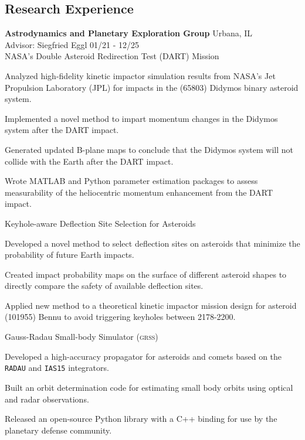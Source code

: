 \documentclass[margin,line]{res}
\newlength{\myitemspacing}
\newenvironment{list_new}{
    \begin{list}{\scriptsize{$\bullet$}}{%
        \setlength{\itemsep}{0in}
        \setlength{\parsep}{\myitemspacing} \setlength{\parskip}{0in}
        \setlength{\topsep}{0in} \setlength{\partopsep}{0in} 
        \setlength{\leftmargin}{0.2in}
        }}
    {\end{list}
}
\begin{document}
\begin{resume}
\section{\sc Research Experience}
{\bf Astrodynamics and Planetary Exploration Group} \hfill Urbana, IL\\
Advisor: Siegfried Eggl \hfill 01/21 - 12/25\\
NASA's Double Asteroid Redirection Test (DART) Mission
\begin{list_new}
    \item Analyzed high-fidelity kinetic impactor simulation results from NASA's Jet Propulsion Laboratory (JPL) for impacts in the (65803) Didymos binary asteroid system.
    \item Implemented a novel method to impart momentum changes in the Didymos system after the DART impact.
    \item Generated updated B-plane maps to conclude that the Didymos system will not collide with the Earth after the DART impact.
    \item Wrote MATLAB and Python parameter estimation packages to assess measurability of the heliocentric momentum enhancement from the DART impact.
\end{list_new}
Keyhole-aware Deflection Site Selection for Asteroids
\begin{list_new}
    \item Developed a novel method to select deflection sites on asteroids that minimize the probability of future Earth impacts.
    \item Created impact probability maps on the surface of different asteroid shapes to directly compare the safety of available deflection sites.
    \item Applied new method to a theoretical kinetic impactor mission design for asteroid (101955) Bennu to avoid triggering keyholes between 2178-2200.
\end{list_new}
Gauss-Radau Small-body Simulator (\textsc{grss})
\begin{list_new}
    \item Developed a high-accuracy propagator for asteroids and comets based on the \texttt{RADAU} and \texttt{IAS15} integrators.
    \item Built an orbit determination code for estimating small body orbits using optical and radar observations.
    \item Released an open-source Python library with a C++ binding for use by the planetary defense community.
\end{list_new}

\end{resume}
\end{document}
